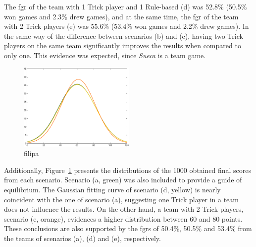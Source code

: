 The \ac{fgr} of the team with 1 Trick player and 1 Rule-based (d) was 52.8\% (50.5\% won games and 2.3\% drew games), and at the same time, the \ac{fgr} of the team with 2 Trick players (e) was 55.6\% (53.4\% won games and 2.2\% drew games).
In the same way of the difference between scenarios (b) and (c), having two Trick players on the same team significantly improves the results when compared to only one.
This evidence was expected, since \emph{Sueca} is a team game.

\begin{figure}[h!]
  \centering
    \includegraphics[width=0.5\textwidth]{./img/4/ADE}
  \caption{filipa}
\label{fig:ADE}
\end{figure}

Additionally, Figure~\ref{fig:ADE} presents the distributions of the 1000 obtained final scores from each scenario.
Scenario (a, green) was also included to provide a guide of equilibrium.
The Gaussian fitting curve of scenario (d, yellow) is nearly coincident with the one of scenario (a), suggesting one Trick player in a team does not influence the results.
On the other hand, a team with 2 Trick players, scenario (e, orange), evidences a higher distribution between 60 and 80 points.
These conclusions are also supported by the \acp{fgr} of 50.4\%, 50.5\% and 53.4\% from the teams of scenarios (a), (d) and (e), respectively.

